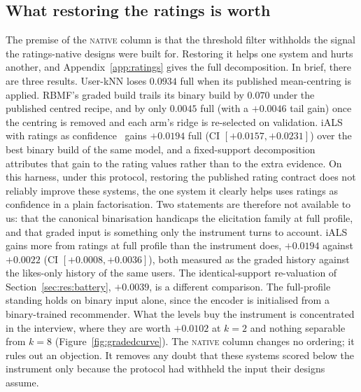 \documentclass[manuscript,screen,review]{acmart}
\begin{document}
\subsection{What restoring the ratings is worth}\label{sec:ratings}
The premise of the \textsc{native} column is that the threshold filter withholds the signal the ratings-native designs were built for. Restoring it helps one system and hurts another, and Appendix~\ref{app:ratings} gives the full decomposition. In brief, there are three results. User-kNN loses $0.0934$ full when its published mean-centring is applied. RBMF's graded build trails its binary build by $0.070$ under the published centred recipe, and by only $0.0045$ full (with a $+0.0046$ tail gain) once the centring is removed and each arm's ridge is re-selected on validation. iALS with ratings as confidence~\citep{hu2008collaborative} gains $+0.0194$ full (CI $[+0.0157,+0.0231]$) over the best binary build of the same model, and a fixed-support decomposition attributes that gain to the rating values rather than to the extra evidence. On this harness, under this protocol, restoring the published rating contract does not reliably improve these systems, the one system it clearly helps uses ratings as confidence in a plain factorisation. Two statements are therefore not available to us: that the canonical binarisation handicaps the elicitation family at full profile, and that graded input is something only the instrument turns to account. iALS gains more from ratings at full profile than the instrument does, $+0.0194$ against $+0.0022$ (CI $[+0.0008,+0.0036]$), both measured as the graded history against the likes-only history of the same users. The identical-support re-valuation of Section~\ref{sec:res:battery}, $+0.0039$, is a different comparison. The full-profile standing holds on binary input alone, since the encoder is initialised from a binary-trained recommender. What the levels buy the instrument is concentrated in the interview, where they are worth $+0.0102$ at $k{=}2$ and nothing separable from $k{=}8$ (Figure~\ref{fig:gradedcurve}). The \textsc{native} column changes no ordering; it rules out an objection. It removes any doubt that these systems scored below the instrument only because the protocol had withheld the input their designs assume.
\end{document}
